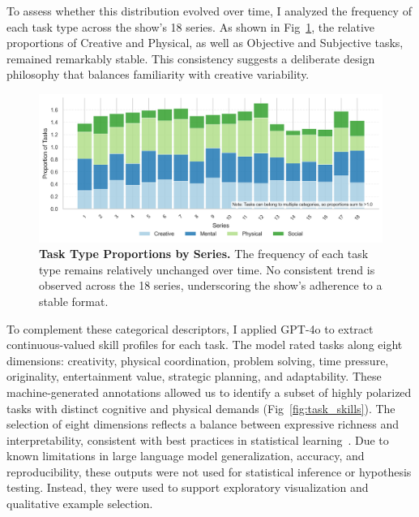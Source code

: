 \documentclass[10pt,letterpaper]{article}
\begin{document}
To assess whether this distribution evolved over time, I analyzed the frequency of each task type across the show's 18 series. As shown in Fig~\ref{fig:task_type_stability}, the relative proportions of Creative and Physical, as well as Objective and Subjective tasks, remained remarkably stable. This consistency suggests a deliberate design philosophy that balances familiarity with creative variability.

\begin{figure}[!h]
\centering
\includegraphics[width=\linewidth]{FiguresPNG/Fig2.png}
\caption{{\bf Task Type Proportions by Series.}
The frequency of each task type remains relatively unchanged over time. No consistent trend is observed across the 18 series, underscoring the show's adherence to a stable format.}
\label{fig:task_type_stability}
\end{figure}
\FloatBarrier



To complement these categorical descriptors, I applied GPT-4o to extract continuous-valued skill profiles for each task. The model rated tasks along eight dimensions: creativity, physical coordination, problem solving, time pressure, originality, entertainment value, strategic planning, and adaptability. These machine-generated annotations allowed us to identify a subset of highly polarized tasks with distinct cognitive and physical demands (Fig~\ref{fig:task_skills}). The selection of eight dimensions reflects a balance between expressive richness and interpretability, consistent with best practices in statistical learning~\cite{Hastie2009,James2013}. Due to known limitations in large language model generalization, accuracy, and reproducibility, these outputs were not used for statistical inference or hypothesis testing. Instead, they were used to support exploratory visualization and qualitative example selection.
\end{document}
